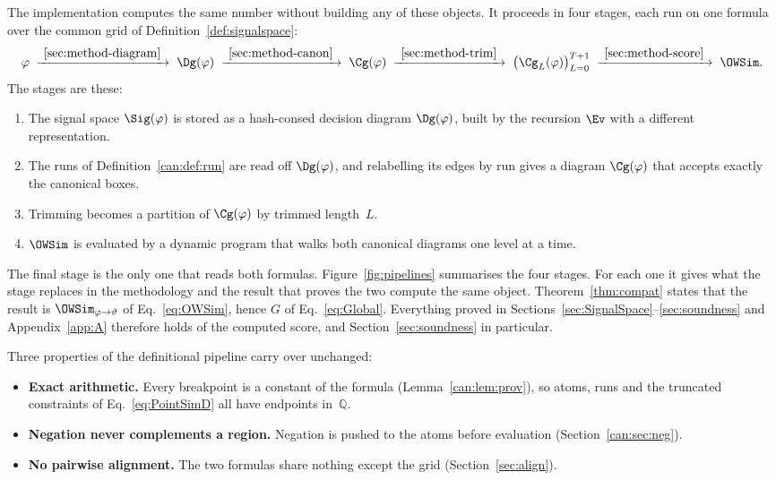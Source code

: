 The implementation computes the same number without building any of these
objects. It proceeds in four stages, each run on one formula over the common
grid of Definition~\ref{def:signalspace}:
\[
  \varphi
  \;\xrightarrow{\ \ref{sec:method-diagram}\ }\; \Dg(\varphi)
  \;\xrightarrow{\ \ref{sec:method-canon}\ }\; \Cg(\varphi)
  \;\xrightarrow{\ \ref{sec:method-trim}\ }\; \bigl(\Cg_L(\varphi)\bigr)_{L=0}^{T+1}
  \;\xrightarrow{\ \ref{sec:method-score}\ }\; \OWSim .
\]
The stages are these:
\begin{enumerate}
  \item The signal space $\Sig(\varphi)$ is stored as a hash-consed decision
    diagram $\Dg(\varphi)$, built by the recursion $\Ev$ with a different
    representation.
  \item The runs of Definition~\ref{can:def:run} are read off $\Dg(\varphi)$, and
    relabelling its edges by run gives a diagram $\Cg(\varphi)$ that accepts
    exactly the canonical boxes.
  \item Trimming becomes a partition of $\Cg(\varphi)$ by trimmed length~$L$.
  \item $\OWSim$ is evaluated by a dynamic program that walks both canonical
    diagrams one level at a time.
\end{enumerate}
The final stage is the only one that reads both formulas.
Figure~\ref{fig:pipelines} summarises the four stages. For each one it gives
what the stage replaces in the methodology and the result that proves the two
compute the same object.
Theorem~\ref{thm:compat} states that the result is $\OWSim_{\varphi\to\vartheta}$
of Eq.~\eqref{eq:OWSim}, hence $G$ of Eq.~\eqref{eq:Global}. Everything proved
in Sections~\ref{sec:SignalSpace}--\ref{sec:soundness} and Appendix~\ref{app:A} therefore holds of the computed score, and
Section~\ref{sec:soundness} in particular.

Three properties of the definitional pipeline carry over unchanged:
\begin{itemize}
  \item \textbf{Exact arithmetic.} Every breakpoint is a constant of the formula
    (Lemma~\ref{can:lem:prov}), so atoms, runs and the truncated constraints of
    Eq.~\eqref{eq:PointSimD} all have endpoints in~$\mathbb{Q}$.
  \item \textbf{Negation never complements a region.} Negation is pushed to the
    atoms before evaluation (Section~\ref{can:sec:neg}).
  \item \textbf{No pairwise alignment.} The two formulas share nothing except
    the grid (Section~\ref{sec:align}).
\end{itemize}

